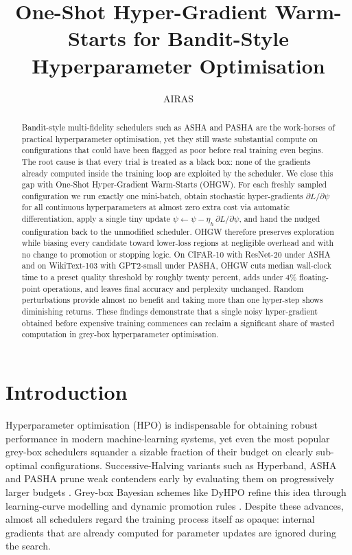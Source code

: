 \documentclass{article}
\title{One-Shot Hyper-Gradient Warm-Starts for Bandit-Style Hyperparameter Optimisation}
\author{AIRAS}
\begin{document}
\maketitle

\begin{abstract}
Bandit-style multi-fidelity schedulers such as ASHA and PASHA are the work-horses of practical hyperparameter optimisation, yet they still waste substantial compute on configurations that could have been flagged as poor before real training even begins. The root cause is that every trial is treated as a black box: none of the gradients already computed inside the training loop are exploited by the scheduler. We close this gap with One-Shot Hyper-Gradient Warm-Starts (OHGW). For each freshly sampled configuration we run exactly one mini-batch, obtain stochastic hyper-gradients \(\partial L/\partial \psi\) for all continuous hyperparameters at almost zero extra cost via automatic differentiation, apply a single tiny update \(\psi \leftarrow \psi - \eta_h\, \partial L/\partial \psi\), and hand the nudged configuration back to the unmodified scheduler. OHGW therefore preserves exploration while biasing every candidate toward lower-loss regions at negligible overhead and with no change to promotion or stopping logic. On CIFAR-10 with ResNet-20 under ASHA and on WikiText-103 with GPT2-small under PASHA, OHGW cuts median wall-clock time to a preset quality threshold by roughly twenty percent, adds under 4\% floating-point operations, and leaves final accuracy and perplexity unchanged. Random perturbations provide almost no benefit and taking more than one hyper-step shows diminishing returns. These findings demonstrate that a single noisy hyper-gradient obtained before expensive training commences can reclaim a significant share of wasted computation in grey-box hyperparameter optimisation.
\end{abstract}

\section{Introduction}
Hyperparameter optimisation (HPO) is indispensable for obtaining robust performance in modern machine-learning systems, yet even the most popular grey-box schedulers squander a sizable fraction of their budget on clearly sub-optimal configurations. Successive-Halving variants such as Hyperband, ASHA and PASHA prune weak contenders early by evaluating them on progressively larger budgets \cite{bohdal-2022-pasha}. Grey-box Bayesian schemes like DyHPO refine this idea through learning-curve modelling and dynamic promotion rules \cite{wistuba-2022-supervising}. Despite these advances, almost all schedulers regard the training process itself as opaque: internal gradients that are already computed for parameter updates are ignored during the search.
\end{document}
